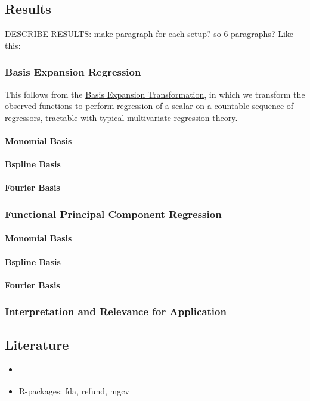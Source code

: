 \documentclass[11pt,twoside,a4paper]{article}
\begin{document}
	\subsection{Results}
	{\color{green}DESCRIBE RESULTS: make paragraph for each setup? so 6 paragraphs? Like this: }
	
	
	\subsubsection{Basis Expansion Regression}
	This follows from the \hyperref[basis_exp_transf]{Basis Expansion Transformation}, in which we transform the observed functions to perform regression of a scalar on a countable sequence of regressors, tractable with typical multivariate regression theory. 
	\paragraph{Monomial Basis}
	\paragraph{Bspline Basis}
	\paragraph{Fourier Basis}
	
	\subsubsection{Functional Principal Component Regression}
	\paragraph{Monomial Basis}
	\paragraph{Bspline Basis}
	\paragraph{Fourier Basis}
	
	\subsubsection{Interpretation and Relevance for Application}

	\subsection{Literature}
	\begin{itemize}
		\item \cite{shonkwiler_explorations_2009}
		\item R-packages: fda, refund, mgcv
	\end{itemize}
	
\end{document}
